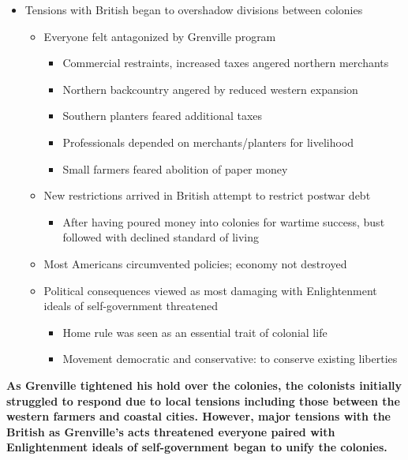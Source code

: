 \documentclass[a4paper]{article}
\begin{document}
{\begin{itemize}
\begin{itemize}
\begin{itemize}
\begin{itemize}
                \end{itemize}
            \end{itemize}
        \end{itemize}
        \item Tensions with British began to overshadow divisions between colonies
        \begin{itemize}
            \item Everyone felt antagonized by Grenville program
            \begin{itemize}
                \item Commercial restraints, increased taxes angered northern merchants
                \item Northern backcountry angered by reduced western expansion
                \item Southern planters feared additional taxes
                \item Professionals depended on merchants/planters for livelihood
                \item Small farmers feared abolition of paper money
            \end{itemize}
            \item New restrictions arrived in British attempt to restrict postwar debt
            \begin{itemize}
                \item After having poured money into colonies for wartime success, bust followed with declined standard of living
            \end{itemize}
            \item Most Americans circumvented policies; economy not destroyed
            \item Political consequences viewed as most damaging with Enlightenment ideals of self-government threatened
            \begin{itemize}
                \item Home rule was seen as an essential trait of colonial life
                \item Movement democratic and conservative: to conserve existing liberties
            \end{itemize}
        \end{itemize}
    \end{itemize}
    \textbf{As Grenville tightened his hold over the colonies, the colonists initially struggled to respond due to local tensions including those between the western farmers and coastal cities. However, major tensions with the British as Grenville's acts threatened everyone paired with Enlightenment ideals of self-government began to unify the colonies.}}
\end{document}
